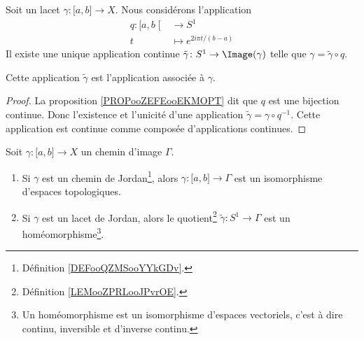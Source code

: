 \begin{lemmaDef}     \label{LEMooZPRLooJPvrOE}
    Soit un lacet \( \gamma\colon \mathopen[ a , b \mathclose]\to X\). Nous considérons l'application
    \begin{equation}
        \begin{aligned}
            q\colon \mathopen[ a , b \mathclose[&\to S^1 \\
            t&\mapsto  e^{2i\pi t/(b-a)} 
        \end{aligned}
    \end{equation}
    Il existe une unique application continue \( \tilde \gamma\colon S^1\to \Image(\gamma)\) telle que \( \gamma=\tilde \gamma\circ q\).

    Cette application \( \tilde \gamma\) est l'application  associée à \( \gamma\).
\end{lemmaDef}

\begin{proof}
    La proposition \ref{PROPooZEFEooEKMOPT} dit que \( q\) est une bijection continue. Donc l'existence et l'unicité d'une application \( \tilde \gamma=\gamma\circ q^{-1}\). Cette application est continue comme composée d'applications continues.
\end{proof}

\begin{lemma}     \label{LEMooCGVOooVPlSRD}
    Soit \( \gamma\colon \mathopen[ a , b \mathclose]\to X\) un chemin d'image \( \Gamma\).
    \begin{enumerate}
        \item       \label{ITEMooWKVAooCQDvpL}
            Si \( \gamma\) est un chemin de Jordan\footnote{Définition \ref{DEFooQZMSooYYkGDv}.}, alors \( \gamma\colon \mathopen[ a , b \mathclose]\to \Gamma\) est un isomorphisme d'espaces topologiques.
        \item       \label{ITEMooVYMXooEtgPJT}
            Si \( \gamma\) est un lacet de Jordan, alors le quotient\footnote{Définition \ref{LEMooZPRLooJPvrOE}.} \( \tilde \gamma\colon S^1\to \Gamma\) est un homéomorphisme\footnote{Un homéomorphisme est un isomorphisme d'espaces vectoriels, c'est à dire continu, inversible et d'inverse continu.}.
    \end{enumerate}
\end{lemma}

